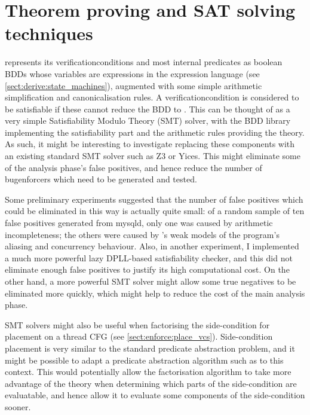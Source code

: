\section{Theorem proving and SAT solving techniques}

{\Technique} represents its \glspl{verificationcondition} and most
internal predicates as boolean BDDs whose variables are expressions in
the {\StateMachine} expression language (see
\autoref{sect:derive:state_machines}), augmented with some simple
arithmetic simplification and canonicalisation rules.  A
\gls{verificationcondition} is considered to be satisfiable if these
cannot reduce the BDD to \false.  This can be thought of as a very
simple Satisfiability Modulo Theory (SMT) solver\cite{Barrett2009},
with the BDD library implementing the satisfiability part and the
arithmetic rules providing the theory.  As such, it might be
interesting to investigate replacing these components with an existing
standard SMT solver such as Z3\cite{Moura2008} or
Yices\cite{Dutertre2006}.  This might eliminate some of the analysis
phase's false positives, and hence reduce the number of
\glspl{bugenforcer} which need to be generated and tested.

Some preliminary experiments suggested that the number of false
positives which could be eliminated in this way is actually quite
small: of a random sample of ten false positives generated from
mysqld, only one was caused by arithmetic incompleteness; the others
were caused by {\technique}'s weak models of the program's aliasing
and concurrency behaviour.  Also, in another experiment, I implemented
a much more powerful lazy DPLL-based satisfiability
checker\cite{Davis1962}, and this did not eliminate enough false
positives to justify its high computational cost.  On the other hand,
a more powerful SMT solver might allow some true negatives to be
eliminated more quickly, which might help to reduce the cost of the
main analysis phase.

SMT solvers might also be useful when factorising the side-condition
for placement on a thread CFG (see \autoref{sect:enforce:place_vcs}).
Side-condition placement is very similar to the standard predicate
abstraction problem\cite{Graf1997}, and it might be possible to adapt
a predicate abstraction algorithm such as \cite{Lahiri2006} to this
context.  This would potentially allow the factorisation algorithm to
take more advantage of the theory when determining which parts of the
side-condition are evaluatable, and hence allow it to evaluate some
components of the side-condition sooner.


